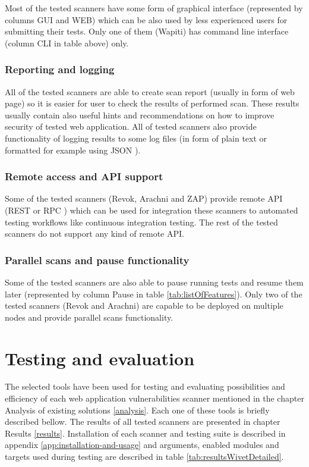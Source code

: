 	Most of the tested scanners have some form of graphical interface (represented by columns GUI and WEB) which can be also used by less experienced users for submitting their tests. Only one of them (Wapiti) has command line interface (column CLI in table above) only.	
	
	\subsection{Reporting and logging}
	 All of the tested scanners are able to create scan report (usually in form of web page) so it is easier for user to check the results of performed scan. These results usually contain also useful hints and recommendations on how to improve security of tested web application. All of tested scanners also provide functionality of logging results to some log files (in form of plain text or formatted for example using JSON \cite{JSON}).
	 
	 \subsection{Remote access and API support}
	Some of the tested scanners (Revok, Arachni and ZAP) provide remote API (REST \cite{RESTAPI} or RPC \cite{RPCAPI}) which can be used for integration these scanners to automated testing workflows like continuous integration testing. The rest of the tested scanners do not support any kind of remote API.
	
	\subsection{Parallel scans and pause functionality}	 
	 Some of the tested scanners are also able to pause running tests and resume them later (represented by column Pause in table \ref{tab:listOfFeatures}). Only two of the tested scanners (Revok and Arachni) are capable to be deployed on multiple nodes and provide parallel scans functionality.
	
\chapter{Testing and evaluation}\label{testing-evaluation}

The selected tools have been used for testing and evaluating possibilities and efficiency of each web application vulnerabilities scanner mentioned in the chapter Analysis of existing solutions \ref{analysis}. Each one of these tools is briefly described bellow. The results of all tested scanners are presented in chapter Results \ref{results}. Installation of each scanner and testing suite is described in appendix \ref{app:installation-and-usage} and arguments, enabled modules and targets used during testing are described in table \ref{tab:resultsWivetDetailed}.

